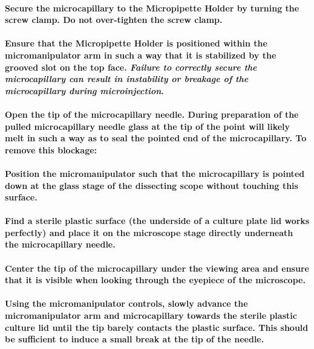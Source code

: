 \documentclass[11pt]{article}
\begin{document}
\paragraph{{\bfseries\sffamily } Secure the microcapillary to the Micropipette Holder by turning the screw clamp. Do not over-tighten the screw clamp.}
\label{sec:orgheadline31}
\paragraph{{\bfseries\sffamily } Ensure that the Micropipette Holder is positioned within the micromanipulator arm in such a way that it is stabilized by the grooved slot on the top face. \emph{Failure to correctly secure the microcapillary can result in instability or breakage of the microcapillary during microinjection}.}
\label{sec:orgheadline32}
\paragraph{{\bfseries\sffamily } Open the tip of the microcapillary needle. During preparation of the pulled microcapillary needle glass at the tip of the point will likely melt in such a way as to seal the pointed end of the microcapillary. To remove this blockage:}
\label{sec:orgheadline33}
\paragraph{{\bfseries\sffamily } Position the micromanipulator such that the microcapillary is pointed down at the glass stage of the dissecting scope without touching this surface.}
\label{sec:orgheadline34}
\paragraph{{\bfseries\sffamily } Find a sterile plastic surface (the underside of a culture plate lid works perfectly) and place it on the microscope stage directly underneath the microcapillary needle.}
\label{sec:orgheadline35}
\paragraph{{\bfseries\sffamily } Center the tip of the microcapillary under the viewing area and ensure that it is visible when looking through the eyepiece of the microscope.}
\label{sec:orgheadline36}
\paragraph{{\bfseries\sffamily } Using the micromanipulator controls, slowly advance the micromanipulator arm and microcapillary towards the sterile plastic culture lid until the tip barely contacts the plastic surface. This should be sufficient to induce a small break at the tip of the needle.}
\label{sec:orgheadline37}
\end{document}
